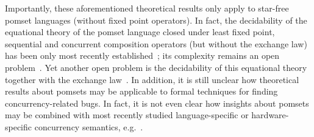 \documentclass{llncs}
\begin{document}
Importantly, these aforementioned theoretical results only apply to star-free pomset languages (without fixed point operators). In fact, the decidability of the equational theory of the pomset language closed under least fixed point, sequential and concurrent composition operators (but without the exchange law) has been only most recently established~\cite{LS2014}; its complexity remains an open problem~\cite{LS2014}. Yet another open problem is the decidability of this equational theory together with the exchange law~\cite{LS2014}. In addition, it is still unclear how theoretical results about pomsets may be applicable to formal techniques for finding concurrency-related bugs. In fact, it is not even clear how insights about pomsets may be combined with most recently studied language-specific or hardware-specific concurrency semantics, e.g.~\cite{SSONM2010,SVZJS2011,BOSSW2011,AMSS2012}.
\end{document}
